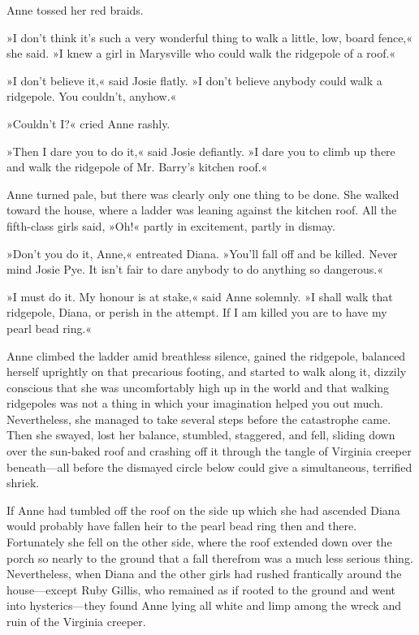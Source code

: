 Anne tossed her red braids.

»I don’t think it’s such a very wonderful thing to walk a little, low, board fence,« she said. »I knew a girl in Marysville who could walk the ridgepole of a roof.«

»I don’t believe it,« said Josie flatly. »I don’t believe anybody could walk a ridgepole. You couldn’t, anyhow.«

»Couldn’t I?« cried Anne rashly.

»Then I dare you to do it,« said Josie defiantly. »I dare you to climb up there and walk the ridgepole of Mr. Barry’s kitchen roof.«

Anne turned pale, but there was clearly only one thing to be done. She walked toward the house, where a ladder was leaning against the kitchen roof. All the fifth-class girls said, »Oh!« partly in excitement, partly in dismay.

»Don’t you do it, Anne,« entreated Diana. »You’ll fall off and be killed. Never mind Josie Pye. It isn’t fair to dare anybody to do anything so dangerous.«

»I must do it. My honour is at stake,« said Anne solemnly. »I shall walk that ridgepole, Diana, or perish in the attempt. If I am killed you are to have my pearl bead ring.«

Anne climbed the ladder amid breathless silence, gained the ridgepole, balanced herself uprightly on that precarious footing, and started to walk along it, dizzily conscious that she was uncomfortably high up in the world and that walking ridgepoles was not a thing in which your imagination helped you out much. Nevertheless, she managed to take several steps before the catastrophe came. Then she swayed, lost her balance, stumbled, staggered, and fell, sliding down over the sun-baked roof and crashing off it through the tangle of Virginia creeper beneath—all before the dismayed circle below could give a simultaneous, terrified shriek.

If Anne had tumbled off the roof on the side up which she had ascended Diana would probably have fallen heir to the pearl bead ring then and there. Fortunately she fell on the other side, where the roof extended down over the porch so nearly to the ground that a fall therefrom was a much less serious thing. Nevertheless, when Diana and the other girls had rushed frantically around the house—except Ruby Gillis, who remained as if rooted to the ground and went into hysterics—they found Anne lying all white and limp among the wreck and ruin of the Virginia creeper.

